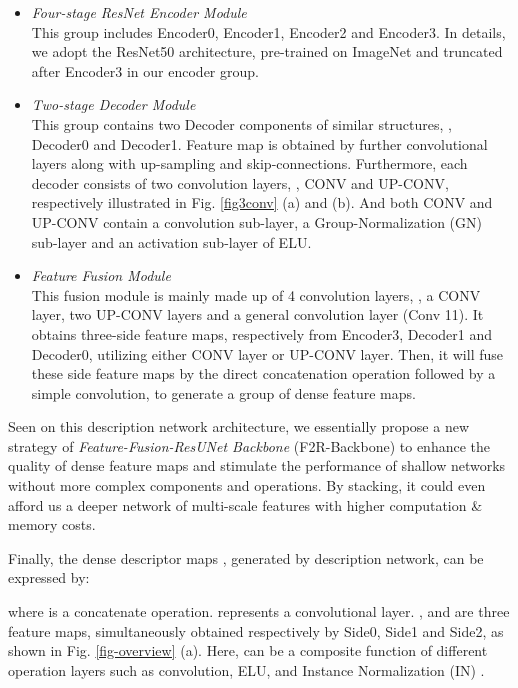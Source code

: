\documentclass[journal]{IEEEtran}
\begin{document}
\begin{itemize}
\item{
\emph{Four-stage ResNet Encoder Module}\\ This group includes Encoder0, Encoder1, Encoder2 and Encoder3. In details, we adopt the ResNet50 \cite{resnet} architecture, pre-trained on ImageNet and truncated after Encoder3 in our encoder group.
}
\item{
\emph{Two-stage Decoder Module}\\ 
This group contains two Decoder components of similar structures, , Decoder0 and Decoder1. Feature map is obtained by further convolutional layers along with up-sampling and skip-connections. Furthermore, each decoder consists of two convolution layers, , CONV and UP-CONV, respectively illustrated in Fig. \ref{fig3conv} (a) and (b). And both CONV and UP-CONV contain a  convolution sub-layer, a Group-Normalization (GN) sub-layer \cite{GN} and an activation sub-layer of ELU.
}
\item{
\emph{Feature Fusion Module}\\
This fusion module is mainly made up of 4 convolution layers, , a CONV layer, two UP-CONV layers and a general convolution layer (Conv 11). It obtains three-side feature maps, respectively from Encoder3, Decoder1 and Decoder0, utilizing either CONV layer or UP-CONV layer. Then, it will fuse these side feature maps by the direct concatenation operation followed by a simple  convolution, to generate a group of dense feature maps. 
}
\end{itemize}

Seen on this description network architecture, we essentially propose a new strategy of \emph{Feature-Fusion-ResUNet Backbone} (F2R-Backbone) to enhance the quality of dense feature maps and stimulate the performance of shallow networks without more complex components and operations. By stacking, it could even afford us a deeper network of multi-scale features with higher computation \& memory costs. 


Finally, the dense descriptor maps , generated by description network, can be expressed by:

where  is a concatenate operation.   represents a  convolutional layer. ,  and  are three feature maps, simultaneously obtained respectively by Side0, Side1 and Side2, as shown in Fig. \ref{fig-overview} (a). 
Here,  can be a composite function of different operation layers such as convolution, ELU, and Instance Normalization (IN) \cite{IN}.
\end{document}
